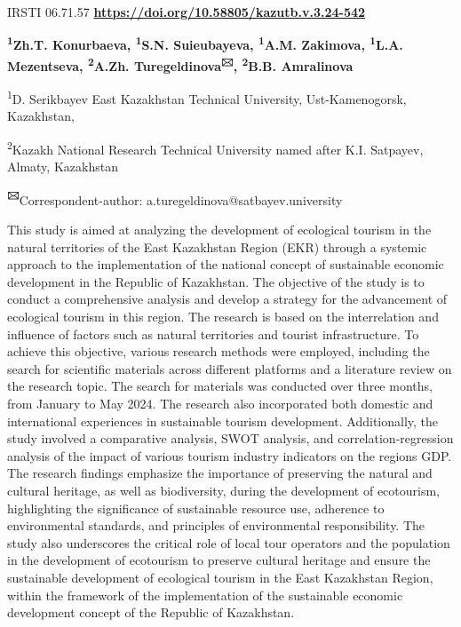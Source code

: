 \newpage
IRSTI 06.71.57
\hfill {\bfseries \href{https://doi.org/10.58805/kazutb.v.3.24-542}{https://doi.org/10.58805/kazutb.v.3.24-542}}


\begin{center}
{\bfseries \textsuperscript{1}Zh.T. Konurbaeva, \textsuperscript{1}S.N.
Suieubayeva, \textsuperscript{1}A.M. Zakimova, \textsuperscript{1}L.A.
Mezentseva, \textsuperscript{2}A.Zh. Turegeldinova\textsuperscript{🖂},
\textsuperscript{2}B.B. Amralinova}

\textsuperscript{1}D. Serikbayev East Kazakhstan Technical University,
Ust-Kamenogorsk, Kazakhstan,

\textsuperscript{2}Kazakh National Research Technical University named
after K.I. Satpayev, Almaty, Kazakhstan
\end{center}

{\bfseries \textsuperscript{🖂}}Correspondent-author:
a.turegeldinova@satbayev.university

This study is aimed at analyzing the development of ecological tourism
in the natural territories of the East Kazakhstan Region (EKR) through a
systemic approach to the implementation of the national concept of
sustainable economic development in the Republic of Kazakhstan. The
objective of the study is to conduct a comprehensive analysis and
develop a strategy for the advancement of ecological tourism in this
region. The research is based on the interrelation and influence of
factors such as natural territories and tourist infrastructure. To
achieve this objective, various research methods were employed,
including the search for scientific materials across different platforms
and a literature review on the research topic. The search for materials
was conducted over three months, from January to May 2024. The research
also incorporated both domestic and international experiences in
sustainable tourism development. Additionally, the study involved a
comparative analysis, SWOT analysis, and correlation-regression analysis
of the impact of various tourism industry indicators on the
region\textquotesingle s GDP. The research findings emphasize the
importance of preserving the natural and cultural heritage, as well as
biodiversity, during the development of ecotourism, highlighting the
significance of sustainable resource use, adherence to environmental
standards, and principles of environmental responsibility. The study
also underscores the critical role of local tour operators and the
population in the development of ecotourism to preserve cultural
heritage and ensure the sustainable development of ecological tourism in
the East Kazakhstan Region, within the framework of the implementation
of the sustainable economic development concept of the Republic of
Kazakhstan.

